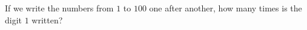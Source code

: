 If we write the numbers from $1$ to $100$ one after another, how many times is the digit $1$ written?
